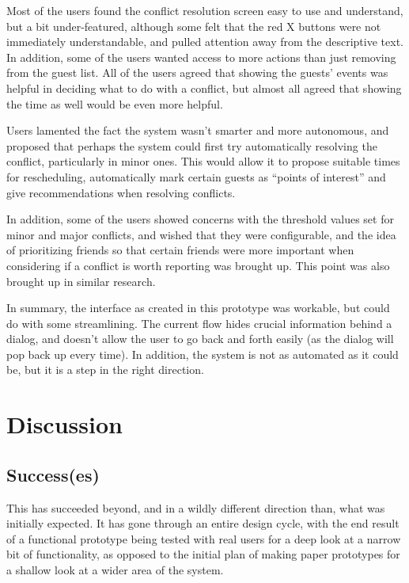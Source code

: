 \documentclass[a4paper,11pt]{report}
\begin{document}
Most of the users found the conflict resolution screen easy to use and
understand, but a bit under-featured, although some felt that the red X buttons
were not immediately understandable, and pulled attention away from the
descriptive text. In addition, some of the users wanted access to more actions
than just removing from the guest list. All of the users agreed that showing the
guests' events was helpful in deciding what to do with a conflict, but almost
all agreed that showing the time as well would be even more helpful.

Users lamented the fact the system wasn't smarter and more autonomous, and
proposed that perhaps the system could first try automatically resolving the
conflict, particularly in minor ones. This would allow it to propose suitable
times for rescheduling, automatically mark certain guests as ``points of
interest'' and give recommendations when resolving conflicts.

In addition, some of the users showed concerns with the threshold values set for
minor and major conflicts, and wished that they were configurable, and the idea
of prioritizing friends so that certain friends were more important when
considering if a conflict is worth reporting was brought up. This point was also
brought up in similar research\cite{benhassine07,haynes97:_autom_meetin_sched_system}.

In summary, the interface as created in this prototype was workable, but could
do with some streamlining. The current flow hides crucial information behind a
dialog, and doesn't allow the user to go back and forth easily (as the dialog
will pop back up every time). In addition, the system is not as automated as it
could be, but it is a step in the right direction.

\chapter{Discussion}

\section{Success(es)}

This has succeeded beyond, and in a wildly different direction than, what was
initially expected. It has gone through an entire design cycle, with the end
result of a functional prototype being tested with real users for a deep look at
a narrow bit of functionality, as opposed to the initial plan of making paper
prototypes for a shallow look at a wider area of the system.
\end{document}
